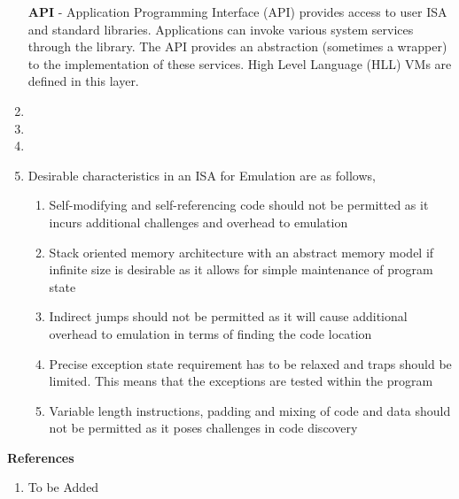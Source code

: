 \documentclass[11pt,a4paper,oneside]{article}
\begin{document}
\begin{enumerate}
		\textbf{API} - Application Programming Interface (API) provides access to user ISA and standard libraries. Applications can invoke various system services through the library. The API provides an abstraction (sometimes a wrapper) to the implementation of these services. High Level Language (HLL) VMs are defined in this layer. 
		\item 
		\item
		\item  
		\item Desirable characteristics in an ISA for Emulation are as follows,
		      \begin{enumerate}
		      	\item Self-modifying and self-referencing code should not be permitted as it incurs additional challenges and overhead to emulation
		      	\item Stack oriented memory architecture with an abstract memory model if infinite size is desirable as it allows for simple maintenance of program state
		      	\item Indirect jumps should not be permitted as it will cause additional overhead to emulation in terms of finding the code location
		      	\item Precise exception state requirement has to be relaxed and traps should be limited. This means that the exceptions are tested within the program
		      	\item Variable length instructions, padding and mixing of code and data should not be permitted as it poses challenges in code discovery	      	
		      \end{enumerate}
		    
	\end{enumerate}
    
    \textbf{References}
    \begin{enumerate}
    	\item To be Added    	
    \end{enumerate}
 

    
\end{document}
